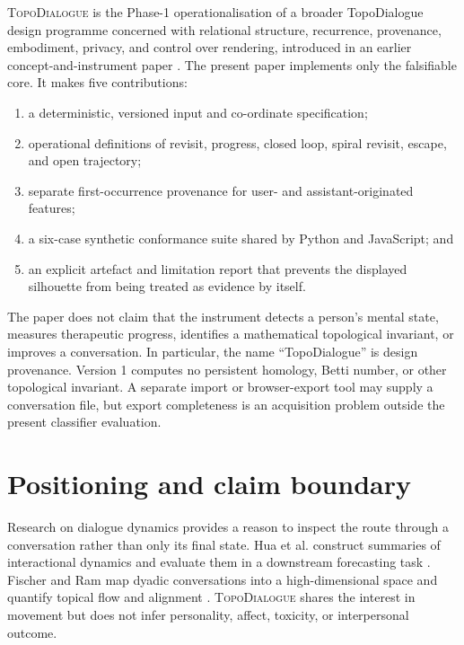 \documentclass[11pt]{article}
\newcommand{\system}{\textsc{TopoDialogue}}
\begin{document}
\system{} is the Phase-1 operationalisation of a broader TopoDialogue design
programme concerned with relational structure, recurrence, provenance,
embodiment, privacy, and control over rendering, introduced in an earlier
concept-and-instrument paper \citep{sakakibara2026topodialogue}. The present
paper implements only the falsifiable core. It makes five contributions:

\begin{enumerate}
  \item a deterministic, versioned input and co-ordinate specification;
  \item operational definitions of revisit, progress, closed loop, spiral
        revisit, escape, and open trajectory;
  \item separate first-occurrence provenance for user- and assistant-originated
        features;
  \item a six-case synthetic conformance suite shared by Python and JavaScript;
        and
  \item an explicit artefact and limitation report that prevents the displayed
        silhouette from being treated as evidence by itself.
\end{enumerate}

The paper does not claim that the instrument detects a person's mental state,
measures therapeutic progress, identifies a mathematical topological invariant,
or improves a conversation. In particular, the name ``TopoDialogue'' is design
provenance. Version 1 computes no persistent homology, Betti number, or other
topological invariant. A separate import or browser-export tool may supply a
conversation file, but export completeness is an acquisition problem outside
the present classifier evaluation.

\section{Positioning and claim boundary}

Research on dialogue dynamics provides a reason to inspect the route through a
conversation rather than only its final state. Hua et al. construct summaries
of interactional dynamics and evaluate them in a downstream forecasting task
\citep{hua2024dynamics}. Fischer and Ram map dyadic conversations into a
high-dimensional space and quantify topical flow and alignment
\citep{fischer2024trajectories}. \system{} shares the interest in movement but
does not infer personality, affect, toxicity, or interpersonal outcome.
\end{document}
